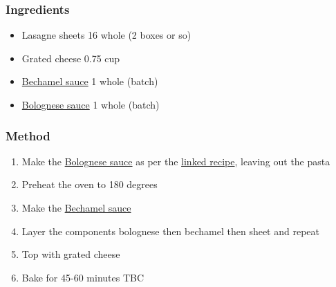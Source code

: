 \documentclass[]{article}
\begin{document}
\subsubsection*{\Large Ingredients}
\begin{multicols}{2}
\begin{itemize}
 \item Lasagne sheets \hfill 16 whole (2 boxes or so)
 \item Grated cheese \hfill 0.75 cup
 \item \hyperref[rec:Bechamel]{Bechamel sauce} \hfill 1 whole (batch)
 \item \hyperref[rec:Bolognese]{Bolognese sauce} \hfill 1 whole (batch)
\end{itemize}
\end{multicols}
\subsubsection*{\Large Method}
\begin{enumerate}[font=\huge\color{accent}]
	\item Make the \hyperref[rec:Bolognese]{Bolognese sauce} as per the \hyperref[rec:Bolognese]{linked recipe}, leaving out the pasta
	\item Preheat the oven to 180 degrees
	\item Make the \hyperref[rec:Bechamel]{Bechamel sauce}
	\item Layer the components bolognese then bechamel then sheet and repeat
	\item Top with grated cheese
	\item Bake for 45-60 minutes TBC
\end{enumerate}
\newpage
{}\label{rec:Nachos}
\end{document}
